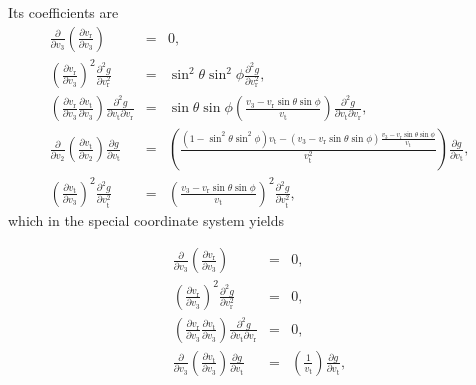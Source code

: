 \documentclass[11pt]{article}
\newcommand{\rt}{\mathrm{t}}
\newcommand{\rr}{\mathrm{r}}
\newcommand{\vr}{v_{\rr}}
\newcommand{\vt}{v_{\rt}}
\begin{document}
\begin{appendices}
Its coefficients are
\begin{equation}
\begin{array}{ccl}
  \displaystyle{\frac{\partial}{\partial v_{3}}\left(\frac{\partial \vr}{\partial v_{3}}\right)}&=& \displaystyle{0} ,\\
  \displaystyle{\left(\frac{\partial \vr}{\partial v_{3}}\right)^{2}\frac{\partial^{2}g}{\partial \vr^{2}}}&=& \displaystyle{\sin^{2}\theta\sin^{2}\phi\frac{\partial^{2}g}{\partial \vr^{2}}} ,\\
  \displaystyle{\left(\frac{\partial \vr}{\partial v_{3}}\frac{\partial \vt}{\partial v_{3}}\right)\frac{\partial^{2}g}{\partial \vt\partial \vr}}&=& \displaystyle{\sin\theta\sin\phi\left(\frac{v_{3}-\vr\sin\theta\sin\phi}{\vt}\right)\frac{\partial^{2}g}{\partial \vt\partial \vr}} ,\\
  \displaystyle{\frac{\partial}{\partial v_{2}}\left(\frac{\partial \vt}{\partial v_{2}}\right)\frac{\partial g}{\partial \vt}}&=& \displaystyle{\left(\frac{(1-\sin^{2}\theta\sin^{2}\phi)\vt-(v_{3}-\vr\sin\theta\sin\phi)\frac{v_{3}-\vr\sin\theta\sin\phi}{\vt}}{\vt^{2}}\right)\frac{\partial g}{\partial \vt}} ,\\
 
  \displaystyle{\left(\frac{\partial \vt}{\partial v_{3}}\right)^{2}\frac{\partial^{2}g}{\partial \vt^{2}}}&=& \displaystyle{\left(\frac{v_{3}-\vr\sin\theta\sin\phi}{\vt}\right)^{2}\frac{\partial^{2}g}{\partial \vt^{2}}} ,
\end{array}
\label{eq:d2gdv32_Coeffs_Arbitrary}
\end{equation}
which in the special coordinate system yields

\begin{equation}
\begin{array}{ccl}
  \displaystyle{\frac{\partial}{\partial v_{3}}\left(\frac{\partial \vr}{\partial v_{3}}\right)}&=& \displaystyle{0} ,\\
  \displaystyle{\left(\frac{\partial \vr}{\partial v_{3}}\right)^{2}\frac{\partial^{2}g}{\partial \vr^{2}}}&=& \displaystyle{0} ,\\
  \displaystyle{\left(\frac{\partial \vr}{\partial v_{3}}\frac{\partial \vt}{\partial v_{3}}\right)\frac{\partial^{2}g}{\partial \vt\partial \vr}}&=& \displaystyle{0} ,\\
  \displaystyle{\frac{\partial}{\partial v_{3}}\left(\frac{\partial \vt}{\partial v_{3}}\right)\frac{\partial g}{\partial \vt}}&=& \displaystyle{\left(\frac{1}{\vt}\right)\frac{\partial g}{\partial \vt}} ,\\
 

\end{array}
\end{equation}
\end{appendices}
\end{document}
